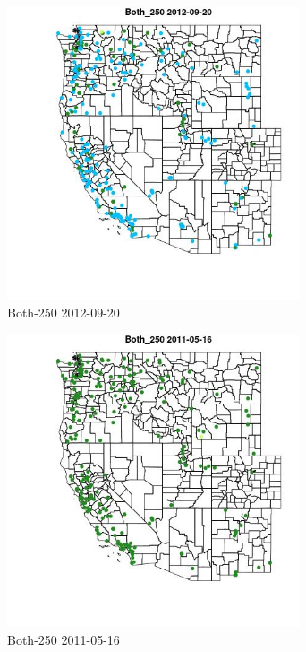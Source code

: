\begin{figure} 
\centering  
\includegraphics[width=0.77\textwidth]{Code_Outputs/ML_input_report_ML_input_PM25_Step5_part_d_de_duplicated_aves_ML_input_MapObsBoth_2502012-09-20.jpg} 
\caption{\label{fig:ML_input_report_ML_input_PM25_Step5_part_d_de_duplicated_aves_ML_inputMapObsBoth_2502012-09-20}Both-250 2012-09-20} 
\end{figure} 
 

\clearpage 

\begin{figure} 
\centering  
\includegraphics[width=0.77\textwidth]{Code_Outputs/ML_input_report_ML_input_PM25_Step5_part_d_de_duplicated_aves_ML_input_MapObsBoth_2502011-05-16.jpg} 
\caption{\label{fig:ML_input_report_ML_input_PM25_Step5_part_d_de_duplicated_aves_ML_inputMapObsBoth_2502011-05-16}Both-250 2011-05-16} 
\end{figure} 
 


